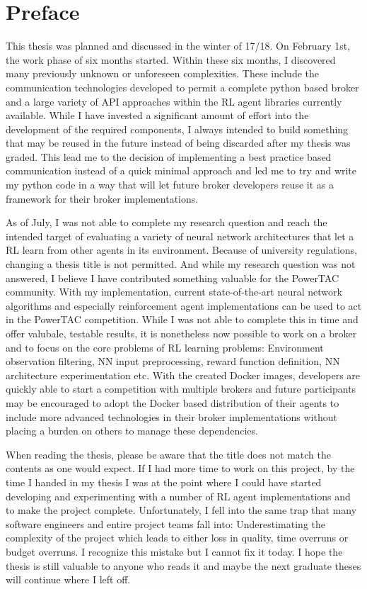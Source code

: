 \section*{Preface}

This thesis was planned and discussed in the winter of 17/18. On February 1st, the work phase of six months started.
Within these six months, I discovered many previously unknown or unforeseen complexities. These include the
communication technologies developed to permit a complete python based broker and a large variety of API approaches
within the RL agent libraries currently available. While I have invested a significant amount of effort into the
development of the required components, I always intended to build something that may be reused in the future instead of
being discarded after my thesis was graded. This lead me to the decision of implementing a best practice based
communication instead of a quick minimal approach and led me to try and write my python code in a way that will let
future broker developers reuse it as a framework for their broker implementations. 

As of July, I was not able to complete my research question and reach the intended target of evaluating a variety of
neural network architectures that let a RL learn from other agents in its environment. Because of university
regulations, changing a thesis title is not permitted. And while my research question was not answered, I believe I have
contributed something valuable for the PowerTAC community. With my implementation, current state-of-the-art neural
network algorithms and especially reinforcement agent implementations can be used to act in the PowerTAC competition.
While I was not able to complete this in time and offer valubale, testable results, it is nonetheless now possible to
work on a broker and to focus on the core problems of RL learning problems: Environment observation filtering, NN input
preprocessing, reward function definition, NN architecture experimentation etc. With the created Docker images,
developers are quickly able to start a competition with multiple brokers and future participants may be encouraged to
adopt the Docker based distribution of their agents to include more advanced technologies in their broker
implementations without placing a burden on others to manage these dependencies.   

When reading the thesis, please be aware that the title does not match the contents as one would expect. If I had more
time to work on this project, by the time I handed in my thesis I was at the point where I could have started developing
and experimenting with a number of  RL agent implementations and to make the project complete. Unfortunately, I fell
into the same trap that many software engineers and entire project teams fall into: Underestimating the complexity of
the project which leads to either loss in quality, time overruns or budget overruns. I recognize this mistake but I
cannot fix it today. I hope the thesis is still valuable to anyone who reads it and maybe the next graduate theses will
continue where I left off. 
